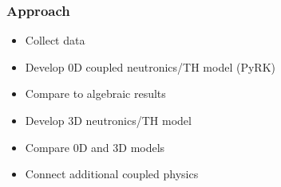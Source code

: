 \begin{frame}[fragile]
  \frametitle{Approach}
  \begin{itemize}
    \item Collect data
    \item Develop 0D coupled neutronics/TH model (PyRK)
    \item Compare to algebraic results
    \item Develop 3D neutronics/TH model
    \item Compare 0D and 3D models
    \item Connect additional coupled physics
  \end{itemize}

\end{frame}
